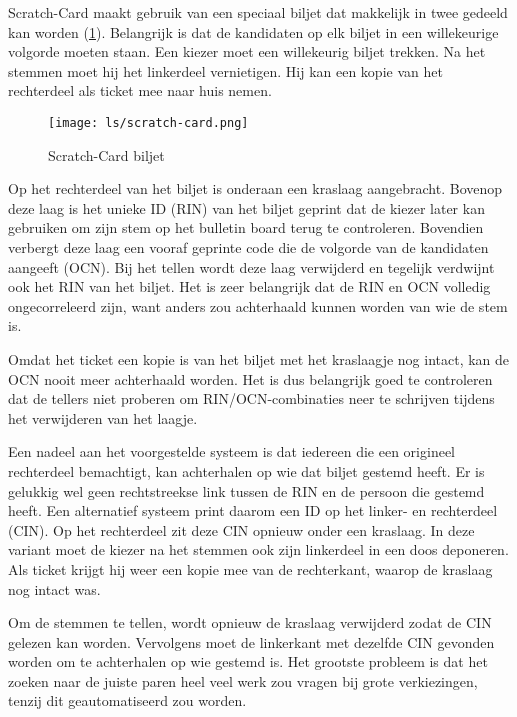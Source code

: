 Scratch-Card\cite{randell_ryan_voting_technologies_and_trust} maakt gebruik van een speciaal biljet dat makkelijk in twee gedeeld kan worden (\ref{fig:ls:scratch-card}). Belangrijk is dat de kandidaten op elk biljet in een willekeurige volgorde moeten staan. Een kiezer moet een willekeurig biljet trekken. Na het stemmen moet hij het linkerdeel vernietigen. Hij kan een kopie van het rechterdeel als ticket mee naar huis nemen.

\begin{figure}
  \centering
  \texttt{[image: ls/scratch-card.png]}
  \caption[Scratch-Card biljet]{Scratch-Card biljet~\cite{randell_ryan_voting_technologies_and_trust}}
  \label{fig:ls:scratch-card}
\end{figure}

\npar Op het rechterdeel van het biljet is onderaan een kraslaag aangebracht. Bovenop deze laag is het unieke ID (RIN) van het biljet geprint dat de kiezer later kan gebruiken om zijn stem op het bulletin board terug te controleren. Bovendien verbergt deze laag een vooraf geprinte code die de volgorde van de kandidaten aangeeft (OCN). Bij het tellen wordt deze laag verwijderd en tegelijk verdwijnt ook het RIN van het biljet. Het is zeer belangrijk dat de RIN en OCN volledig ongecorreleerd zijn, want anders zou achterhaald kunnen worden van wie de stem is.

\npar Omdat het ticket een kopie is van het biljet met het kraslaagje nog intact, kan de OCN nooit meer achterhaald worden. Het is dus belangrijk goed te controleren dat de tellers niet proberen om RIN/OCN-combinaties neer te schrijven tijdens het verwijderen van het laagje.

\npar Een nadeel aan het voorgestelde systeem is dat iedereen die een origineel rechterdeel bemachtigt, kan achterhalen op wie dat biljet gestemd heeft. Er is gelukkig wel geen rechtstreekse link tussen de RIN en de persoon die gestemd heeft. Een alternatief systeem print daarom een ID op het linker- en rechterdeel (CIN). Op het rechterdeel zit deze CIN opnieuw onder een kraslaag. In deze variant moet de kiezer na het stemmen ook zijn linkerdeel in een doos deponeren. Als ticket krijgt hij weer een kopie mee van de rechterkant, waarop de kraslaag nog intact was.

\npar Om de stemmen te tellen, wordt opnieuw de kraslaag verwijderd zodat de CIN gelezen kan worden. Vervolgens moet de linkerkant met dezelfde CIN gevonden worden om te achterhalen op wie gestemd is. Het grootste probleem is dat het zoeken naar de juiste paren heel veel werk zou vragen bij grote verkiezingen, tenzij dit geautomatiseerd zou worden.

